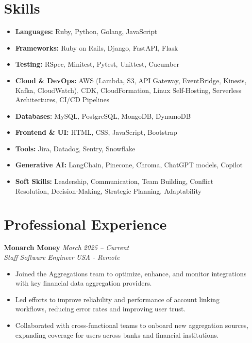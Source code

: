 \documentclass[a4paper,10pt]{article}
\begin{document}
\section*{Skills}
\sectionline
\vspace{-1em}
\begin{itemize}[leftmargin=0.5cm]
	\item \textbf{Languages:} Ruby, Python, Golang, JavaScript
	\item \textbf{Frameworks:} Ruby on Rails, Django, FastAPI, Flask
	\item \textbf{Testing:} RSpec, Minitest, Pytest, Unittest, Cucumber
	\item \textbf{Cloud \& DevOps:} AWS (Lambda, S3, API Gateway, EventBridge,
	      Kinesis, Kafka, CloudWatch), CDK, CloudFormation, Linux Self-Hosting,
	      Serverless Architectures, CI/CD Pipelines
	\item \textbf{Databases:} MySQL, PostgreSQL, MongoDB, DynamoDB
	\item \textbf{Frontend \& UI:} HTML, CSS, JavaScript, Bootstrap
	\item \textbf{Tools:} Jira, Datadog, Sentry, Snowflake
	\item \textbf{Generative AI:} LangChain, Pinecone, Chroma, ChatGPT models,
	      Copilot
	\item \textbf{Soft Skills:} Leadership, Communication, Team Building,
	      Conflict Resolution, Decision-Making, Strategic Planning, Adaptability
\end{itemize}

\section*{Professional Experience}
\sectionline
\vspace{-1em}

\textbf{Monarch Money} \hfill \textit{March 2025 -- Current}\\
\textit{Staff Software Engineer} \hfill \textit{USA - Remote}\\
\begin{itemize}[leftmargin=0.5cm, topsep=0pt, parsep=0pt, itemsep=2pt]
    \item Joined the Aggregations team to optimize, enhance, and monitor
          integrations with key financial data aggregation providers.
    \item Led efforts to improve reliability and performance of account linking
          workflows, reducing error rates and improving user trust.
    \item Collaborated with cross-functional teams to onboard new aggregation
          sources, expanding coverage for users across banks and financial
          institutions.
\end{itemize}
\end{document}
